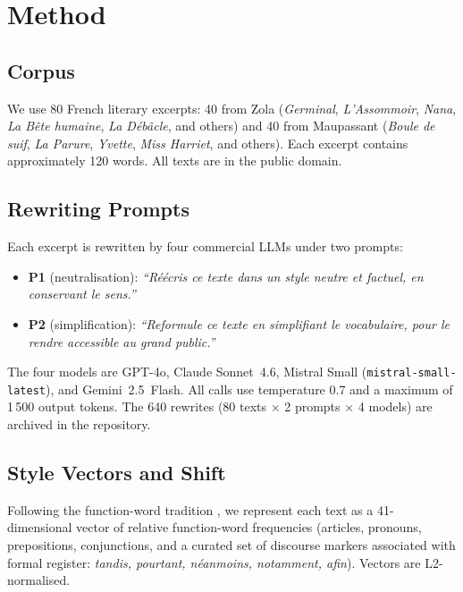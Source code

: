 \documentclass[11pt,a4paper]{article}
\begin{document}
\section{Method}
\label{sec:method}

\subsection{Corpus}

We use 80 French literary excerpts: 40 from Zola
(\textit{Germinal}, \textit{L'Assommoir}, \textit{Nana},
\textit{La Bête humaine}, \textit{La Débâcle}, and others)
and 40 from Maupassant
(\textit{Boule de suif}, \textit{La Parure}, \textit{Yvette},
\textit{Miss Harriet}, and others).
Each excerpt contains approximately 120 words.
All texts are in the public domain.

\subsection{Rewriting Prompts}

Each excerpt is rewritten by four commercial LLMs under two prompts:

\begin{itemize}
  \item \textbf{P1} (neutralisation): \textit{``Réécris ce texte dans un
    style neutre et factuel, en conservant le sens.''}
  \item \textbf{P2} (simplification): \textit{``Reformule ce texte en
    simplifiant le vocabulaire, pour le rendre accessible au grand public.''}
\end{itemize}

The four models are GPT-4o, Claude Sonnet~4.6, Mistral Small
(\texttt{mistral-small-latest}), and Gemini~2.5~Flash.
All calls use temperature 0.7 and a maximum of 1\,500 output tokens.
The 640 rewrites (80 texts $\times$ 2 prompts $\times$ 4 models)
are archived in the repository.

\subsection{Style Vectors and Shift}

Following the function-word tradition \citep{burrows1987,stamatatos2009},
we represent each text as a 41-dimensional vector of relative
function-word frequencies (articles, pronouns, prepositions, conjunctions,
and a curated set of discourse markers associated with formal register:
\textit{tandis, pourtant, néanmoins, notamment, afin}).
Vectors are L2-normalised.
\end{document}
